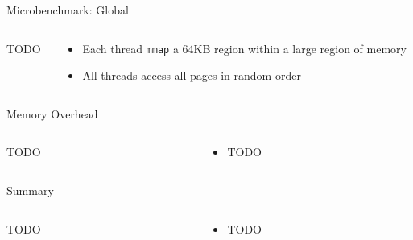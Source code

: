\documentclass[aspectratio=169]{beamer}
\newcommand{\bi}{\begin{itemize}}
\newcommand{\ei}{\end{itemize}}
\begin{document}
\begin{frame}{Microbenchmark: Global}
  \begin{columns}[T]
    \begin{column}{0.2\textwidth}
      TODO
    \end{column}
    \begin{column}{0.8\textwidth}
      \bi
    \item Each thread \texttt{mmap} a 64KB region within a large region of memory
    \item All threads access all pages in random order
      \ei
    \end{column}
  \end{columns}
\end{frame}

\begin{frame}{Memory Overhead}
  \begin{columns}[T]
    \begin{column}{0.2\textwidth}
      TODO
    \end{column}
    \begin{column}{0.8\textwidth}
      \bi
    \item TODO
      \ei
    \end{column}
  \end{columns}
\end{frame}

\begin{frame}{Summary}
  \begin{columns}[T]
    \begin{column}{0.2\textwidth}
      TODO
    \end{column}
    \begin{column}{0.8\textwidth}
      \bi
    \item TODO
      \ei
    \end{column}
  \end{columns}
\end{frame}



\end{document}

